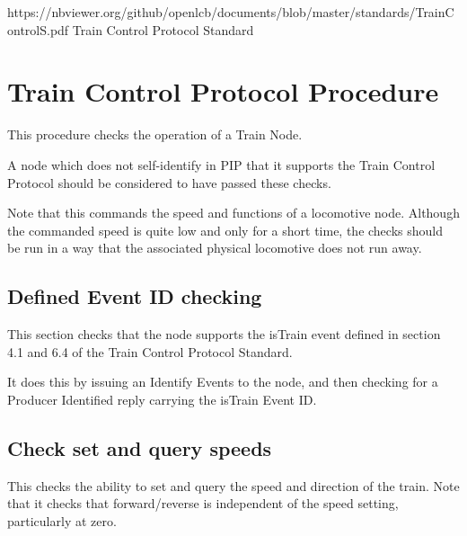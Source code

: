



\maketitle
\thispagestyle{firststyle}

\introductionCaveats
    {https://nbviewer.org/github/openlcb/documents/blob/master/standards/TrainControlS.pdf}
    {Train Control Protocol Standard}

\section{Train Control Protocol Procedure}


This procedure checks the operation of a Train Node.  

A node which does not self-identify in PIP that it supports
the Train Control Protocol should be considered to have passed these checks.
\pipsetFootnote

Note that this commands the speed and functions of a locomotive node.
Although the commanded speed is quite low and only for a short time, the
checks should be run in a way that the associated physical locomotive
does not run away.

\subsection{Defined Event ID checking}

This section checks that the node supports the isTrain event
defined in section 4.1 and 6.4 of the Train Control Protocol Standard.

It does this by issuing an Identify Events to the node, and then
checking for a Producer Identified reply carrying the isTrain Event ID.

\subsection{Check set and query speeds}

This checks the ability to set and query the speed and direction of the train.
Note that it checks that forward/reverse is independent of the speed setting, particularly
at zero.

